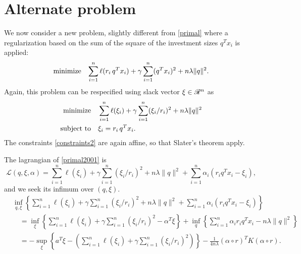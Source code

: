 \documentclass{article}
\newcommand{\lag}{\mathscr{L}}
\newcommand{\sumi}{\sum_{i=1}^n}
\begin{document}
\section{Alternate problem}

We now consider a new problem, slightly different from \eqref{primal} where a
regularization based on the sum of the square of the investment sizes $q^Tx_i$ is applied:
\begin{equation}
  \label{primal2000}
  \minimizeEquation{\sumi \ell(r_i\,q^Tx_i) + \gamma\sumi(q^Tx_i)^2 + n\lambda\|q\|^2}.
\end{equation}
Again, this problem can be respecified using slack vector $\xi \in \mathscr{R}^n$ as
\begin{align}
  \minimizeEquationSt{\label{primal2001}\sumi \ell(\xi_i) + \gamma\sumi(\xi_i/r_i)^2 + n\lambda\|q\|^2}[\label{constraints2}\xi_i = r_i\,q^Tx_i].
\end{align}
The constraints \eqref{constraints2} are again affine, so that Slater's theorem apply.

The lagrangian of \eqref{primal2001} is
\begin{equation}
  \lag(q,\xi,\alpha) = \sumi \ell(\xi_i) + \gamma\sumi(\xi_i/r_i)^2 + n\lambda\|q\|^2 + \sumi \alpha_i(r_iq^Tx_i - \xi_i),
\end{equation}
and we seek its infimum over $(q,\xi)$.
\begin{align}
  &\inf_{q,\xi} \left\{\sumi \ell(\xi_i) + \gamma\sumi (\xi_i/r_i)^2 + n\lambda\|q\|^2 + \sumi \alpha_i(r_iq^Tx_i -
    \xi_i)\right\}\\
  &\quad =\inf_\xi\left\{\sumi \ell(\xi_i) + \gamma\sumi(\xi_i/r_i)^2 - \alpha^T\xi\right\} + \inf_q\left\{\sumi
    \alpha_ir_iq^Tx_i - n\lambda\|q\|^2\right\}\\
  &\quad = - \sup_\xi\left\{a^T\xi - \left(\sumi \ell(\xi_i) + \gamma\sumi(\xi_i/r_i)^2\right)\right\}
    - \frac{1}{4n\lambda} (\alpha \circ r)^TK(\alpha \circ r)\label{this}.
\end{align}
\end{document}
